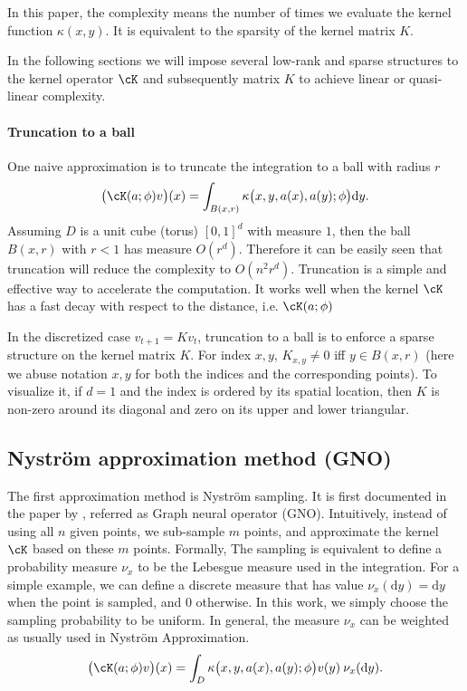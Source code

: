 \begin{definition}[Complexity]
In this paper, the complexity means the number of times we evaluate the kernel function $\kappa(x,y)$. It is equivalent to the sparsity of the kernel matrix $K$.
\end{definition}

In the following sections we will impose several low-rank and sparse structures to the kernel operator $\cK$ and subsequently matrix $K$ to achieve linear or quasi-linear complexity.

\paragraph{Truncation to a ball} 
One naive approximation is to truncate the integration to a ball with radius $r$
\begin{equation}
\label{eq:truncation}
\bigl(\cK(a;\phi)v\bigr)(x)=   
\int_{B(x,r)} \kappa\big(x,y,a(x),a(y);\phi\big) \mathrm{d}y. 
\end{equation}
Assuming $D$ is a unit cube (torus) $[0,1]^d$ with measure $1$, then the ball $B(x,r)$ with $r<1$ has measure $O(r^d)$. Therefore it can be easily seen that truncation will reduce the complexity to $O(n^2 r^d)$. Truncation is a simple and effective way to accelerate the computation. It works well when the kernel $\cK$ has a fast decay with respect to the distance, i.e. $\cK(a;\phi)$

In the discretized case $v_{t+1} = K v_t$, truncation to a ball is to enforce a sparse structure on the kernel matrix $K$. For index $x,y$, $K_{x,y} \neq 0 $ iff $y \in B(x,r)$ (here we abuse notation $x,y$ for both the indices and the corresponding points). To visualize it, if $d=1$ and the index is ordered by its spatial location, then $K$ is non-zero around its diagonal and zero on its upper and lower triangular.
\fi 

\iffalse
\subsection{Nystr\"om approximation method (GNO)}
\label{sec:nystrom}
The first approximation method is Nystr\"om sampling. 
It is first documented in the paper by \cite{li2020neural}, referred as Graph neural operator (GNO).
Intuitively, instead of using all $n$ given points, we sub-sample $m$ points, and approximate the kernel $\cK$ based on these $m$ points. 
Formally, The sampling is equivalent to define a probability measure $\nu_x$ to be the Lebesgue measure used in the integration. For a simple example, we can define a discrete measure that has value $\nu_x(\mathrm{d}y) = \mathrm{d}y$ when the point is sampled, and $0$ otherwise. In this work, we simply choose the sampling probability to be uniform. In general, the measure $\nu_x$ can be weighted as usually used in Nystr\"om Approximation. 
\begin{equation}
\label{eq:R=int}
\bigl(\cK(a;\phi)v\bigr)(x)=   
\int_{D} \kappa\big(x,y,a(x),a(y);\phi\big)
v(y)\: \nu_x(\mathrm{d}y). 
\end{equation}

